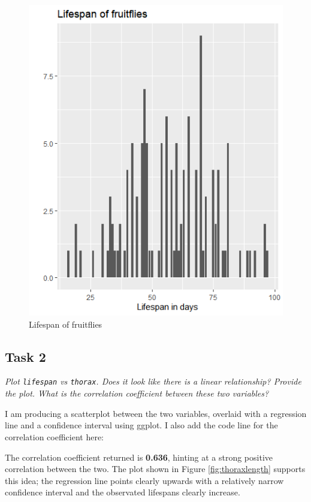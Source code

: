 \documentclass[12pt,a4paper]{article}
\begin{document}
\begin{figure}[h]
	\centering
	\includegraphics[width=\textwidth]{plot1}
	\caption{Lifespan of fruitflies}
	\label{fig:fruitflies}
\end{figure}

\subsection*{Task 2}
\textit{Plot \texttt{lifespan} vs \texttt{thorax}. Does it look like there is a linear relationship? Provide the plot. What is the correlation coefficient between these two variables?}

I am producing a scatterplot between the two variables, overlaid with a regression line and a confidence interval using ggplot. I also add the code line for the correlation coefficient here:



The correlation coefficient returned is \textbf{0.636}, hinting at a strong positive correlation between the two. The plot shown in Figure \ref{fig:thoraxlength} supports this idea; the regression line points clearly upwards with a relatively narrow confidence interval and the observated lifespans clearly increase.
\end{document}
